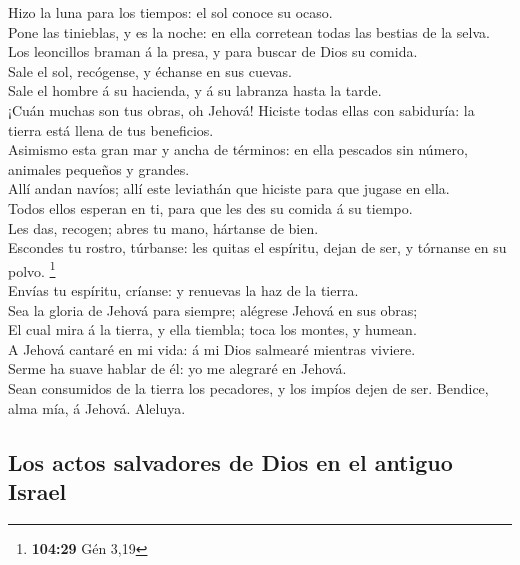  Hizo la luna para los tiempos: el sol conoce su ocaso.\\
 Pone las tinieblas, y es la noche: en ella corretean
todas las bestias de la selva.\\
 Los leoncillos braman á la presa, y para buscar de Dios
su comida.\\
 Sale el sol, recógense, y échanse en sus cuevas.\\
 Sale el hombre á su hacienda, y á su labranza hasta la
tarde.\\
 ¡Cuán muchas son tus obras, oh Jehová! Hiciste todas
ellas con sabiduría: la tierra está llena de tus beneficios.\\
 Asimismo esta gran mar y ancha de términos: en ella
pescados sin número, animales pequeños y grandes.\\
 Allí andan navíos; allí este leviathán que hiciste para
que jugase en ella.\\
 Todos ellos esperan en ti, para que les des su comida á
su tiempo.\\
 Les das, recogen; abres tu mano, hártanse de bien.\\
 Escondes tu rostro, túrbanse: les quitas el espíritu,
dejan de ser, y tórnanse en su polvo. \footnote{\textbf{104:29} Gén 3,19}\\
 Envías tu espíritu, críanse: y renuevas la haz de la
tierra.\\
 Sea la gloria de Jehová para siempre; alégrese Jehová en
sus obras;\\
 El cual mira á la tierra, y ella tiembla; toca los
montes, y humean.\\
 A Jehová cantaré en mi vida: á mi Dios salmearé mientras
viviere.\\
 Serme ha suave hablar de él: yo me alegraré en Jehová.\\
 Sean consumidos de la tierra los pecadores, y los impíos
dejen de ser. Bendice, alma mía, á Jehová. Aleluya.

\hypertarget{los-actos-salvadores-de-dios-en-el-antiguo-israel}{%
\subsection{Los actos salvadores de Dios en el antiguo
Israel}\label{los-actos-salvadores-de-dios-en-el-antiguo-israel}}

